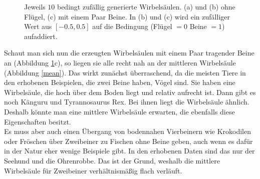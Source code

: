  \begin{figure}
  \qquad
  \qquad
  
  \caption{Jeweils $10$ bedingt zufällig generierte Wirbelsäulen. (a) und (b) ohne Flügel, (c) mit einem Paar Beine. In (b) und (c) wird ein zufälliger Wert aus $[-0.5, 0.5]$ auf die Bedingung (Flügel $= 0$ \bzw Beine $= 1$) aufaddiert.}
  \label{spine_variance}
 \end{figure}

 
 Schaut man sich nun die erzeugten Wirbelsäulen mit einem Paar tragender Beine an (Abbildung \ref{spine_variance}c), so liegen sie alle recht nah an der mittleren Wirbelsäule (Abbildung \ref{mean}).
 Das wirkt zunächst überraschend, da die meisten Tiere in den erhobenen Beispielen, die zwei Beine haben, Vögel sind. Sie haben eine Wirbelsäule, die hoch über dem Boden liegt und relativ aufrecht ist. Dann gibt es noch Känguru und Tyrannosaurus Rex. Bei ihnen liegt die Wirbelsäule ähnlich. Deshalb könnte man eine mittlere Wirbelsäule erwarten, die ebenfalls diese Eigenschaften besitzt.\\
 Es muss aber auch einen Übergang von bodennahen Vierbeinern wie Krokodilen oder Fröschen über Zweibeiner zu Fischen ohne Beine geben, auch wenn es dafür in der Natur eher wenige Beispiele gibt. In den erhobenen Daten sind das nur der Seehund und die Ohrenrobbe. Das ist der Grund, weshalb die mittlere Wirbelsäule für Zweibeiner verhältnismäßig flach verläuft.
 
